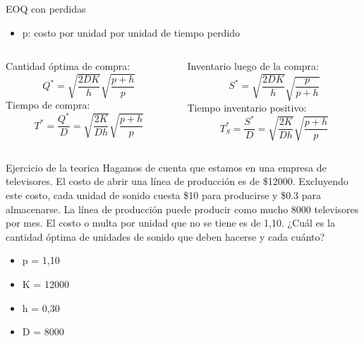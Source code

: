\documentclass{beamer}
\begin{document}
\begin{frame}{EOQ con perdidas}
\begin{itemize}
    \item \textcolor{primary}{p}: costo por unidad por unidad de tiempo perdido
\end{itemize}
    \begin{columns}[T]
        \begin{column}{0.5\textwidth}
            \textcolor{primary}{Cantidad óptima de compra:}
            \[ Q^* = \sqrt{\frac{2DK}{h}}\sqrt{\frac{p+h}{p}} \]
            \vspace{0.5cm}
            \textcolor{primary}{Tiempo de compra:}
            \[T^* = \frac{Q^*}{D}=\sqrt{\frac{2K}{Dh}}\sqrt{\frac{p + h}{p}}\]
        \end{column}
        \begin{column}{0.5\textwidth}
            \textcolor{primary}{Inventario luego de la compra:}
            \[ S^* = \sqrt{\frac{2DK}{h}}\sqrt{\frac{p}{p+h}} \]
            \vspace{0.5cm}
            \textcolor{primary}{Tiempo inventario positivo:}
            \[T_S^* = \frac{S^*}{D} = \sqrt{\frac{2K}{Dh}}\sqrt{\frac{p+h}{p}}\]
        \end{column}
    \end{columns}
\end{frame}

\begin{frame}{Ejercicio de la teorica}
Hagamos de cuenta que estamos en una empresa de televisores. El costo de abrir una línea de producción es de \$12000. Excluyendo este costo, cada unidad de sonido cuesta \$10 para producirse y \$0.3 para almacenarse. La línea de producción puede producir como mucho 8000 televisores por mes. El costo o multa por unidad que no se tiene es de 1,10. ¿Cuál es la cantidad óptima de unidades de sonido que deben hacerse y cada cuánto?
    \begin{itemize}
            \item p = 1,10
            \item K = 12000
            \item h = 0,30
            \item D = 8000
        \end{itemize}
\end{frame}
\end{document}

